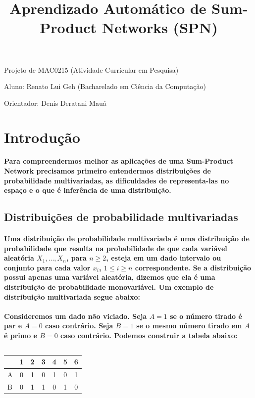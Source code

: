 \documentclass[a4paper,10pt]{article}
\title{\textbf{Aprendizado Automático de Sum-Product Networks (SPN)}}
\theoremstyle{plain}
\begin{document}
\date{}
\author{}
\vspace*{-40pt}
{\let\newpage\relax\maketitle}

Projeto de MAC0215 (Atividade Curricular em Pesquisa)

Aluno: Renato Lui Geh (Bacharelado em Ciência da Computação)

Orientador: Denis Deratani Mauá

\section{Introdução}

\paragraph{
  Para compreendermos melhor as aplicações de uma Sum-Product Network precisamos primeiro entendermos distribuições
de probabilidade multivariadas, as dificuldades de representa-las no espaço e o que é inferência de uma 
distribuição.
}

\subsection{Distribuições de probabilidade multivariadas}

\paragraph{
  Uma distribuição de probabilidade multivariada é uma distribuição de probabilidade que resulta na probabilidade 
de que cada variável aleatória $X_1,...,X_n$, para $n\geq{2}$, esteja em um dado intervalo ou conjunto para cada valor 
$x_i$, $1\leq{i}\geq{n}$ correspondente. Se a distribuição possui apenas uma variável aleatória, dizemos que ela é uma
distribuição de probabilidade monovariável. Um exemplo de distribuição multivariada segue abaixo:
}

\paragraph{
  Consideremos um dado não viciado. Seja $A=1$ se o número tirado é par e $A=0$ caso contrário. Seja $B=1$ se o
mesmo número tirado em $A$ é primo e $B=0$ caso contrário. Podemos construir a tabela abaixo:
}

\begin{table}[h]
\caption{}
\begin{tabular}{l | *{6}{c}}
  & 1 & 2 & 3 & 4 & 5 & 6 \\
\hline
A & 0 & 1 & 0 & 1 & 0 & 1 \\
B & 0 & 1 & 1 & 0 & 1 & 0 \\
\end{tabular}
\end{table}
\end{document}
